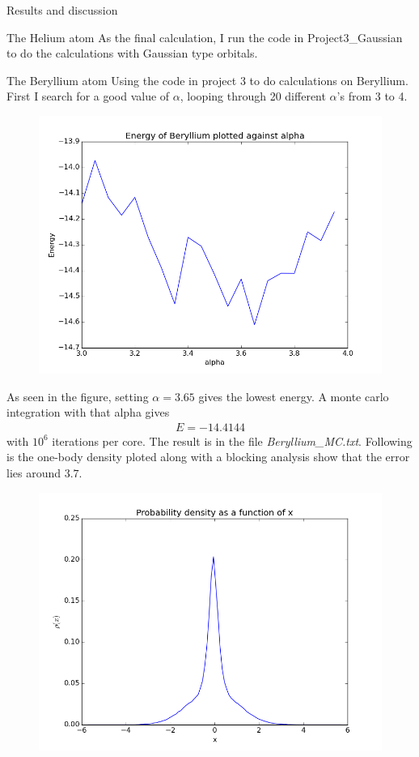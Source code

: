 \documentclass[a4paper, 12pt, titlepage]{article}
\begin{document}
\begin{section}{Results and discussion}
\begin{subsection}{The Helium atom}
    As the final calculation, I run the code in Project3\_Gaussian to do the calculations with Gaussian type orbitals. 
 \end{subsection}
 \begin{subsection}{The Beryllium atom}
 	Using the code in project 3 to do calculations on Beryllium. First I search for a good value of $\alpha$, looping through 20 different $\alpha$'s from 3 to 4.
 \begin{figure}
 	\centering
 	\includegraphics[width=\textwidth]{../python_programs/FindOptimalAlphaBeryllium.png}
 \end{figure}
 As seen in the figure, setting $\alpha = 3.65$ gives the lowest energy. A monte carlo integration with that alpha gives 
 \begin{align*}
 	E = -14.4144
 \end{align*}
 with $10^6$ iterations per core. The result is in the file \textit{Beryllium\_MC.txt}. Following is the one-body density ploted along with a blocking analysis show that the error lies around $3.7$. 
 \begin{figure}
 	\centering
 	\includegraphics[width=\textwidth]{../python_programs/ProbabilityDensityBeryllium.png}

\end{figure}
\end{subsection}
\end{section}
\end{document}
